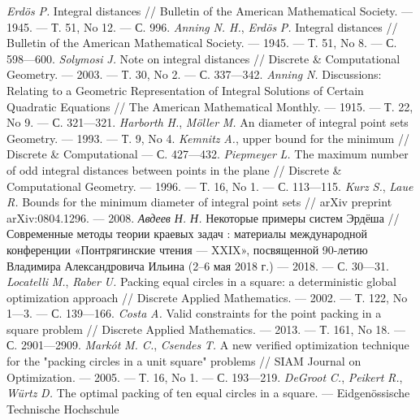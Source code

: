 \begin{thebibliography}{99}
\textsl{Erdös} \textsl{P.} Integral distances // Bulletin of the
American Mathematical Society. — 1945. — Т. 51, No 12. — С. 996.
\textsl{Anning} \textsl{N. H.}, \textsl{Erdös} \textsl{P.}
Integral distances // Bulletin of the American Mathematical
Society. — 1945. — Т. 51, No 8. — С. 598—600.
\textsl{Solymosi} \textsl{J.} Note on integral distances //
Discrete \& Computational Geometry. — 2003. — Т. 30, No 2. —
С. 337—342.
\textsl{Anning} \textsl{N.} Discussions: Relating to a Geometric
Representation of Integral Solutions of Certain Quadratic
Equations // The American Mathematical Monthly. — 1915. —
Т. 22, No 9. — С. 321—321.
\textsl{Harborth} \textsl{H.},
\textsl{Möller} \textsl{M.} An
diameter of integral point sets
Geometry. — 1993. — Т. 9, No 4.
\textsl{Kemnitz} \textsl{A.},
upper bound for the minimum
// Discrete \& Computational
— С. 427—432.
\textsl{Piepmeyer} \textsl{L.} The maximum number of odd
integral distances between points in the plane // Discrete \&
Computational Geometry. — 1996. — Т. 16, No 1. — С. 113—115.
\textsl{Kurz} \textsl{S.}, \textsl{Laue} \textsl{R.} Bounds for
the minimum diameter of integral point sets // arXiv preprint
arXiv:0804.1296. — 2008.
\textsl{Авдеев} \textsl{Н. Н.} Некоторые примеры систем
Эрдёша // Современные методы теории краевых задач :
материалы международной конференции «Понтрягинские
чтения — XXIX», посвященной 90-летию Владимира
Александровича Ильина (2–6 мая 2018 г.) — 2018. — С. 30—31.
\textsl{Locatelli} \textsl{M.}, \textsl{Raber} \textsl{U.} Packing
equal circles in a square: a deterministic global optimization
approach // Discrete Applied Mathematics. — 2002. — Т. 122,
No 1—3. — С. 139—166.
\textsl{Costa} \textsl{A.} Valid constraints for the point packing
in a square problem // Discrete Applied Mathematics. — 2013. —
Т. 161, No 18. — С. 2901—2909.
\textsl{Markót} \textsl{M. C.}, \textsl{Csendes} \textsl{T.} A
new verified optimization technique for the "packing circles in
a unit square" problems // SIAM Journal on Optimization. —
2005. — Т. 16, No 1. — С. 193—219.
\textsl{DeGroot} \textsl{C.}, \textsl{Peikert} \textsl{R.},
\textsl{Würtz} \textsl{D.} The optimal packing of ten equal
circles in a square. — Eidgenössische Technische Hochschule

\end{thebibliography}

